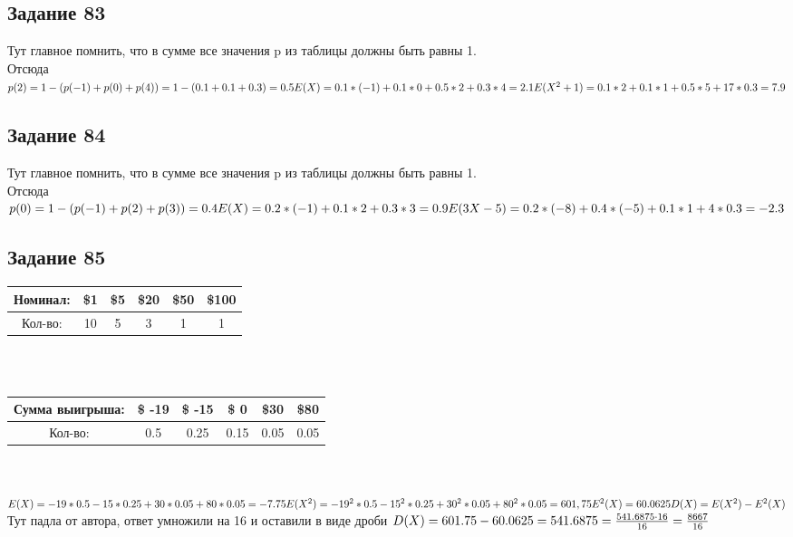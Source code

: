 \documentclass[12pt]{article}
\begin{document}
\subsection{Задание 83}
Тут главное помнить, что в сумме все значения p из таблицы должны быть равны 1.\\
Отсюда \\
$
p(2)=1 - (p(-1) + p(0)+ p(4)) =
  1-(0.1+0.1+0.3)=0.5\\
E(X) = 0.1 * (-1) + 0.1 * 0 + 0.5*2  +  0.3*4 = 2.1\\
E(X^{2}+1) = 0.1 * 2 + 0.1 * 1 + 0.5*5  + 17*0.3 = 7.9\\
$
\newpage
\subsection{Задание 84}
Тут главное помнить, что в сумме все значения p из таблицы должны быть равны 1.\\
Отсюда 
$
p(0)=1 - (p(-1) + p(2)+ p(3)) =  0.4\\
E(X) = 0.2 * (-1) + 0.1 * 2 + 0.3 * 3 = 0.9\\
E(3X-5) = 0.2 * (-8) + 0.4 * (-5)+ 0.1*1  + 4*0.3 = -2.3\\
$
\newpage
\subsection{Задание 85}
\begin{tabular}{|c|c|c|c|c|c|}
\hline
Номинал: & \$1 & \$5 & \$20 & \$50 & \$100 \\
\hline
Кол-во: & 10 & 5 & 3 & 1 & 1 \\
\hline
\end{tabular}
\\
\\
\begin{tabular}{|c|c|c|c|c|c|}
\hline
Сумма выигрыша: & \$ -19 & \$ -15 & \$ 0 & \$30 & \$80 \\
\hline
Кол-во: & 0.5 & 0.25 & 0.15 & 0.05 & 0.05 \\
\hline
\end{tabular}
\\
\\
$
E(X)=-19*0.5-15*0.25+30*0.05+80*0.05=-7.75\\
E(X^2)=-19^2*0.5-15^2*0.25+30^2*0.05+80^2*0.05=601,75\\
E^2(X)=60.0625\\
D(X)=E(X^2)-E^2(X)\\
$
Тут падла от автора, ответ умножили на 16 и оставили в виде дроби
$
D(X)=601.75-60.0625=541.6875=\frac{541.6875\cdot 16}{16}=\frac{8667}{16}\\
$
\end{document}
